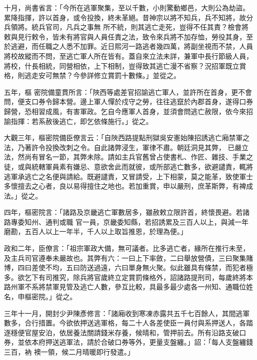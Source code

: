 \begin{pinyinscope}
 十月，尚書省言：「今所在逃軍聚集，至以千數，小則驚動鄉邑，大則公為劫盜。累降指揮，許以首身，或令投換，終未革絕。昔神宗以將不知兵，兵不知將，故分兵領將。統兵官司，凡兵之事無
 所不統，則其逃亡走死，豈得不任其責？檢會將敕與見行敕令，皆未有將官與人員任責之法，致令來兵將不加存恤，勞役其身，至於逃避，而任職之人悉不加罪。近日熙河一路逃者幾四萬，將副坐視而不禁，人員將校故縱而不問，至逃亡軍人所在皆有。蓋自來立法未詳，兼軍中長行節級人員，將校，什長相統，同營相依，上下相制，豈得致其逃亡漫不省察？況招軍既立賞格，則逃走安可無禁？今參詳修立賞罰十數條。」並從之。



 五年，樞
 密院備童貫所言：「陜西等處差官招諭逃亡軍人，並許所在首身，更不會問，便支口券令歸本營。邊上軍人憚於戍守之勞，往往逃竄於內郡首身，遂得口券歸營，恐相習成風，有害軍政。乞自今應軍人首身，並須會問逃亡赦限，依今來招諭指揮：若系赦後逃亡，即乞依條施行。」從之。



 大觀三年，樞密院備臣僚言云：「自陜西路提點刑獄吳安憲始陳招誘逃亡廂禁軍之法，乃著許令投換改刺之令。自此諸弊浸生，軍律不肅。朝廷洞見其弊，
 已嚴立法，然尚有冒名一節，其弊未除。請如主兵官舊曾占使書札、作匠、雜技、手業之徒，或與統轄軍員素有嫌忌、意欲舍此而就彼，或所部逃亡數多，欲避譴責，輒將逃軍承逃亡之名便與請給。既避譴責，又冒請受，上下相蒙，莫之能革，致使軍士多懷擅去之心者，良以易得擅住之地也。若加重賞，申以嚴刑，庶革斯弊，有裨成法。」從之。



 四年，樞密院言：「諸路及京畿逃亡軍數居多，雖赦敕立限許首，終懷畏避。若諸路專委知州、通判或職
 官一員，京畿委知縣，若招誘累及三百人以上，與減一年磨勘，五百人以上一年半，千人以上取旨推恩，於理為便。」



 政和二年，臣僚言：「祖宗軍政大備，無可議者。比多逃亡者，緣所在推行未至，及主兵司官遵奉未嚴故也。其弊有六：一曰上下率斂，二曰舉放營債，三曰聚集賭博，四曰差使不均，五曰防送過遠，六曰單身無火聚。似此雖具有條禁，而犯者極多。欲乞下有司推究，除兵將官歲終立定賞罰條格外，詔諸路提刑司，每歲終將本
 路州軍不系將禁軍見管及逃亡人數，參互比較，具最多最少處各一州知、通職位姓名，申樞密院。」從之。



 三年十一月，開封少尹陳彥修言：「諸廂收到寒凍赤露共五千七百餘人，其間逃軍數多，合行措置。今欲依押送逃軍格，每二十人各差使臣一員付與系押送人，各踏逐穩便官屋安泊，依居養法關請錢米存養，候晴和，管押前去。所有沿路支破口券，並依本府押送逃軍法，請於合破口券等外，更量支盤纏。」詔：「每人支盤纏錢三百，衲
 襖一領，候二月晴暖即行發遣。」




\end{pinyinscope}
